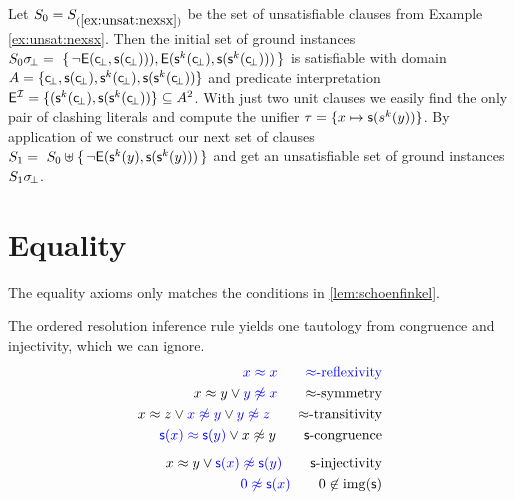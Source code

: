 \begin{example}\label{ex:unsat2}
Let $S_0 = S_{(\ref{ex:unsat:nexsx})}$ be the set of unsatisfiable clauses from Example \ref{ex:unsat:nexsx}. 
Then the initial set of ground instances 
$S_0\sigma\!_\bot =\
\{\,
{ \lnot{\mathsf{E}}({\mathsf c}\!_\bot, {\mathsf s}({\mathsf c}\!_\bot)))}, 
{ {\mathsf{E}}({\mathsf s}^k({\mathsf c}\!_\bot), {\mathsf s}({\mathsf s}^k({\mathsf c}\!_\bot)))}
\,\}$
is satisfiable with domain $A = \{ {\mathsf c}\!_\bot, {\mathsf s}({\mathsf c}\!_\bot), {\mathsf s}^k({\mathsf c}\!_\bot), {\mathsf s}({\mathsf s}^k({\mathsf c}\!_\bot)) \}$
and predicate interpretation 
${\mathsf{E}}^{\mathcal I} = \{ ({\mathsf s}^k({\mathsf c}\!_\bot), {\mathsf s}({\mathsf s}^k({\mathsf c}\!_\bot))
 \} \subseteq A^2$. 
% 
 With just two unit clauses we easily find the only pair of clashing literals and compute the unifier
 $\tau = \{ x\mapsto {\mathsf s}(s^k(y)) \}$. 
 By application of \InstGen we construct our next set of clauses
$
S_1 =\
S_0 \uplus
 \{\,
 { \lnot{\mathsf{E}}({\mathsf s}^k(y), {\mathsf s}({\mathsf s}^k(y)))}
 \,\}
 $ 
 and get an unsatisfiable set of ground instances $S_1\sigma\!_\bot$.
\end{example}




\section{Equality}

The equality axioms only matches the conditions in \vref{lem:schoenfinkel}.

\begin{example} The ordered resolution inference rule yields one tautology from congruence and injectivity,
	which we can ignore.
	\begin{align*}
	\colN x \mEQ x
	\tag*{$\mEQ$-reflexivity}\\
	x \mEQ y \lor {\colN y \mNE x}
	\tag*{$\mEQ$-symmetry}\\
	x \mEQ z \lor {\colN x \mNE y} \lor {\colN y\mNE z}
	\tag*{$\mEQ$-transitivity}\\
	{\colN \msucc(x) \mEQ \msucc(y)} \lor x\mNE y
	\tag*{$\msucc$-congruence}\\[0.5em]
	x \mEQ y \lor {\colN \msucc(x) \mNE \msucc(y)}
	\tag*{$\msucc$-injectivity}\\
	{\colN 0 \mNE \msucc(x)}
	\tag*{$0\not\in\img(\msucc)$}
	\end{align*}
\end{example}

